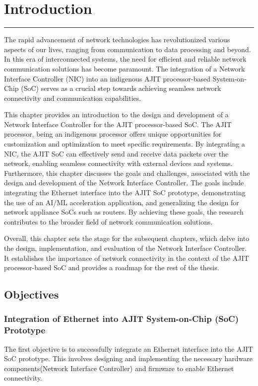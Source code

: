 \documentclass[12pt]{report}
\begin{document}
\chapter{Introduction} \label{1}
\rule[10pt]{\linewidth}{3pt}
 
The rapid advancement of network technologies has revolutionized various aspects of our lives, ranging from communication to data processing and beyond. In this era of interconnected systems, the need for efficient and reliable network communication solutions has become paramount. The integration of a Network Interface Controller (NIC) into an indigenous AJIT processor-based System-on-Chip (SoC) serves as a crucial step towards achieving seamless network connectivity and communication capabilities.

This chapter provides an introduction to the design and development of a Network Interface Controller for the AJIT processor-based SoC. The AJIT processor, being an indigenous processor offers unique opportunities for customization and optimization to meet specific requirements. By integrating a NIC, the AJIT SoC can effectively send and receive data packets over the network, enabling seamless connectivity with external devices and systems. Furthermore, this chapter discusses the goals and challenges, associated with the design and development of the Network Interface Controller. The goals include integrating the Ethernet interface into the AJIT SoC prototype, demonstrating the use of an AI/ML acceleration application, and generalizing the design for network appliance SoCs such as routers. By achieving these goals, the research contributes to the broader field of network communication solutions. 

Overall, this chapter sets the stage for the subsequent chapters, which delve into the design, implementation, and evaluation of the Network Interface Controller. It establishes the importance of network connectivity in the context of the AJIT processor-based SoC and provides a roadmap for the rest of the thesis.



	\section{Objectives}

		\subsection{Integration of Ethernet into AJIT System-on-Chip (SoC) Prototype}
			The first objective is to successfully integrate an Ethernet interface into the AJIT SoC prototype. This involves designing and implementing the necessary hardware components(Network Interface Controller) and firmware to enable Ethernet connectivity.
\end{document}
